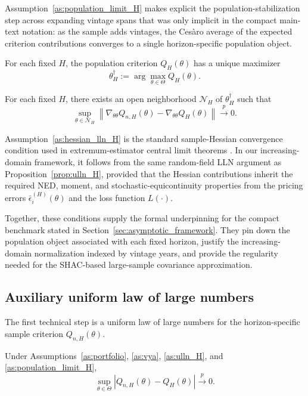 Assumption~\ref{as:population_limit_H} makes explicit the population-stabilization step across expanding vintage spans that was only implicit in the compact main-text notation: as the sample adds vintages, the Ces\`aro average of the expected criterion contributions converges to a single horizon-specific population object.

\begin{assume}
	\label{as:identification_H}
	For each fixed \(H\), the population criterion \(Q_H(\theta)\) has a unique maximizer
	\[
	\theta_H^\dagger
	:=
	\arg\max_{\theta \in \Theta} Q_H(\theta).
	\]
\end{assume}

\begin{assume}
	\label{as:hessian_lln_H}
	For each fixed $H$, there exists an open neighborhood $\mathcal N_H$ of $\theta_H^\dagger$ such that
	\[
	\sup_{\theta \in \mathcal N_H}
	\left\|
	\nabla_{\theta\theta} Q_{n,H}(\theta)
	-
	\nabla_{\theta\theta} Q_H(\theta)
	\right\|
	\xrightarrow{p}
	0.
	\]
\end{assume}

Assumption~\ref{as:hessian_lln_H} is the standard sample-Hessian convergence condition used in extremum-estimator central limit theorems \citep[e.g.,][]{NM94}. In our increasing-domain framework, it follows from the same random-field LLN argument as Proposition~\ref{prop:ulln_H}, provided that the Hessian contributions inherit the required NED, moment, and stochastic-equicontinuity properties from the pricing errors $\bar\epsilon_i^{(H)}(\theta)$ and the loss function $L(\cdot)$.

Together, these conditions supply the formal underpinning for the compact benchmark stated in Section~\ref{sec:asymptotic_framework}. They pin down the population object associated with each fixed horizon, justify the increasing-domain normalization indexed by vintage years, and provide the regularity needed for the SHAC-based large-sample covariance approximation.

\subsection{Auxiliary uniform law of large numbers}

The first technical step is a uniform law of large numbers for the horizon-specific sample criterion \(Q_{n,H}(\theta)\).

\begin{proposition}
	\label{prop:ulln_H}
	Under Assumptions~\ref{as:portfolio}, \ref{as:vya}, \ref{as:ulln_H}, and \ref{as:population_limit_H},
	\[
	\sup_{\theta \in \Theta}
	\left|
	Q_{n,H}(\theta) - Q_H(\theta)
	\right|
	\xrightarrow{p}
	0.
	\]
\end{proposition}


